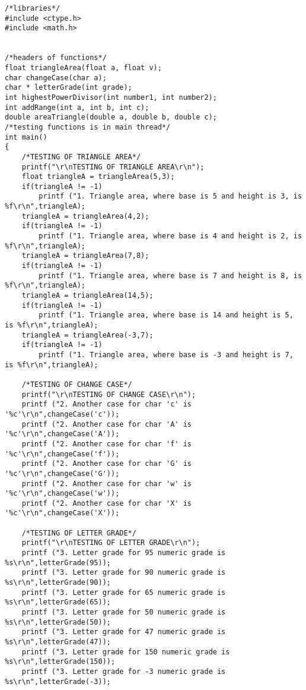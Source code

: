 \documentclass[4pt]{article}
\begin{document}
\begin{verbatim}
/*libraries*/
#include <ctype.h>
#include <math.h>


/*headers of functions*/
float triangleArea(float a, float v);
char changeCase(char a);
char * letterGrade(int grade);
int highestPowerDivisor(int number1, int number2);
int addRange(int a, int b, int c);
double areaTriangle(double a, double b, double c);
/*testing functions is in main thread*/
int main()
{
    /*TESTING OF TRIANGLE AREA*/
    printf("\r\nTESTING OF TRIANGLE AREA\r\n");
    float triangleA = triangleArea(5,3);
    if(triangleA != -1)
        printf ("1. Triangle area, where base is 5 and height is 3, is %f\r\n",triangleA);
    triangleA = triangleArea(4,2);
    if(triangleA != -1)
        printf ("1. Triangle area, where base is 4 and height is 2, is %f\r\n",triangleA);
    triangleA = triangleArea(7,8);
    if(triangleA != -1)
        printf ("1. Triangle area, where base is 7 and height is 8, is %f\r\n",triangleA);
    triangleA = triangleArea(14,5);
    if(triangleA != -1)
        printf ("1. Triangle area, where base is 14 and height is 5, is %f\r\n",triangleA);
    triangleA = triangleArea(-3,7);
    if(triangleA != -1)
        printf ("1. Triangle area, where base is -3 and height is 7, is %f\r\n",triangleA);
    
    /*TESTING OF CHANGE CASE*/
    printf("\r\nTESTING OF CHANGE CASE\r\n");
    printf ("2. Another case for char 'c' is '%c'\r\n",changeCase('c'));
    printf ("2. Another case for char 'A' is '%c'\r\n",changeCase('A'));
    printf ("2. Another case for char 'f' is '%c'\r\n",changeCase('f'));
    printf ("2. Another case for char 'G' is '%c'\r\n",changeCase('G'));
    printf ("2. Another case for char 'w' is '%c'\r\n",changeCase('w'));
    printf ("2. Another case for char 'X' is '%c'\r\n",changeCase('X'));
    
    /*TESTING OF LETTER GRADE*/
    printf("\r\nTESTING OF LETTER GRADE\r\n");
    printf ("3. Letter grade for 95 numeric grade is %s\r\n",letterGrade(95));
    printf ("3. Letter grade for 90 numeric grade is %s\r\n",letterGrade(90));
    printf ("3. Letter grade for 65 numeric grade is %s\r\n",letterGrade(65));
    printf ("3. Letter grade for 50 numeric grade is %s\r\n",letterGrade(50));
    printf ("3. Letter grade for 47 numeric grade is %s\r\n",letterGrade(47));
    printf ("3. Letter grade for 150 numeric grade is %s\r\n",letterGrade(150));
    printf ("3. Letter grade for -3 numeric grade is %s\r\n",letterGrade(-3));
    

\end{verbatim}
\end{document}
